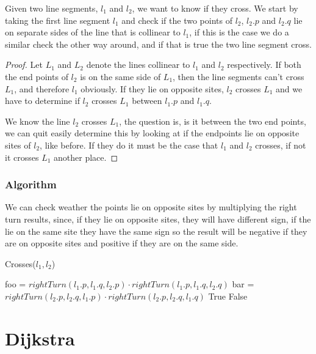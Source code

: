 \begin{Lemma}
Given two line segments, $l_1$ and $l_2$, we want to know if they cross. We start by taking the
first line segment  $l_1$ and check if the two points of $l_2$, $l_2.p$ and
$l_2.q$ lie on separate sides of the line that is collinear to $l_1$, if this is
the case we do a similar check the other way around, and if that is true the
two line segment cross.
\end{Lemma}
\begin{proof}
Let $L_1$ and $L_2$ denote the lines collinear to $l_1$ and $l_2$ respectively.
If both the end points of $l_2$ is on the same side of $L_1$, then the
line segments can't cross $L_1$, and therefore $l_1$ obviously. If they lie on
opposite sites, $l_2$ crosses $L_1$ and we have to determine if $l_2$ crosses
$L_1$ between $l_1.p$ and $l_1.q$. 

We know the line $l_2$ crosses $L_1$, the question is, is it between the two
end points, we can quit easily determine this by looking at if the endpoints
lie on opposite sites of $l_2$, like before. If they do it must be the case
that $l_1$ and $l_2$ crosses, if not it crosses $L_1$ another place.
\end{proof}

\subsubsection{Algorithm}
We can check weather the points lie on opposite sites
by multiplying the right turn results, since, if they lie on opposite sites,
they will have different sign, if the lie on the same site they have the same
sign so the result will be negative if they are on opposite sites and positive
if they are on the same side.
\begin{algorithm}[H]
	\caption{Crosses($l_1,l_2$)}
	\begin{algorithmic}[1] 
		\State foo = $rightTurn(l_1.p,l_1.q,l_2.p)\cdot
		rightTurn(l_1.p,l_1.q,l_2.q)$
		\State bar = $rightTurn(l_2.p,l_2.q,l_1.p)\cdot
		rightTurn(l_2.p,l_2.q,l_1.q)$
		\State \Return True
		\Else
		\State \Return False
		\EndIf
	\end{algorithmic}
\end{algorithm}

\section{Dijkstra}

